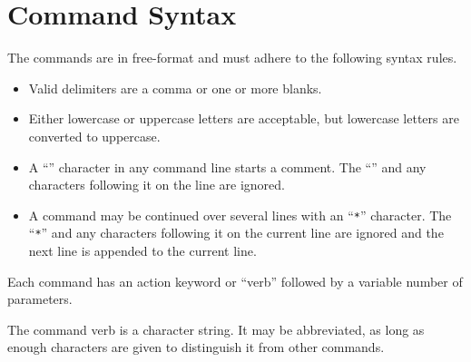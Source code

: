 \section{Command Syntax}
The commands are in free-format and must adhere to the following syntax
rules.
\setlength{\itemsep}{\medskipamount} \begin{itemize}
\item
Valid delimiters are a comma or one or more blanks.
\item
Either lowercase or uppercase letters are acceptable, but lowercase
letters are converted to uppercase.
\item
A ``\cmd{\$}'' character in any command line starts a comment. The
``\cmd{\$}'' and any characters following it on the line are ignored.
\item
A command may be continued over several lines with an ``\verb|*|''
character. The ``\verb|*|'' and any characters following it on the
current line are ignored and the next line is appended to the current
line.
\end{itemize}

Each command has an action keyword or ``verb'' followed by a variable
number of parameters.

The command verb is a character string. It may be abbreviated, as long
as enough characters are given to distinguish it from other commands.

